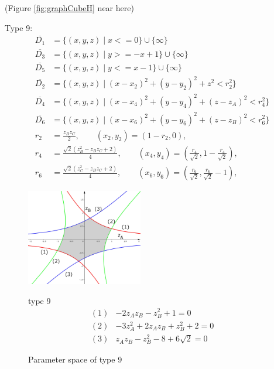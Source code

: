 \documentclass[suppldata, dvipdfmx]{interact}
\theoremstyle{plain}%
\theoremstyle{definition}
\theoremstyle{remark}
\theoremstyle{problemstyle}
\begin{document}
\noindent(Figure \ref{fig:graphCubeH} near here)
\bigskip\par
Type 9:
\begin{align*}
\overline{D_1}&=\{ (x,y,z) \mid x <= 0 \} \cup \{ \infty \}\\
\overline{D_3}&=\{(x,y,z) \mid y >= -x + 1 \} \cup\{\infty\}\\
\overline{D_5}&=\{(x,y,z) \mid y <= x - 1 \} \cup\{\infty\}\\
\overline{D_2}&=\{(x,y,z) \mid (x-x_2)^2+(y-y_2)^2+z^2<r_2^2 \} \\
\overline{D_4}&=\{(x,y,z) \mid (x-x_4)^2+(y-y_4)^2+(z-z_A)^2<r_4^2 \} \\
\overline{D_6}&=\{(x,y,z) \mid (x-x_6)^2+(y-y_6)^2+(z-z_B)^2<r_6^2 \} \\
 r_2 &= \frac{z_Bz_C}{2}, \qquad
(x_2, y_2) = \left(1-r_2, 0\right),\\
 r_4 &= \frac{\sqrt{2}(z_B^2 - z_Bz_C + 2)}{4}, \qquad
(x_4, y_4) = \left(\frac{r_4}{\sqrt{2}}, 1 - \frac{r_4}{\sqrt{2}}\right),\\
 r_6 &= \frac{\sqrt{2}(z_C^2 - z_Bz_C + 2)}{4}, \qquad
(x_6, y_6) = \left(\frac{r_6}{\sqrt{2}}, \frac{r_6}{\sqrt{2}} - 1\right),
\end{align*} 
\begin{figure}[h]
 \begin{minipage}[]{0.5\textwidth}
 \centering
 \includegraphics[width=2in,
 keepaspectratio]{./img/graph/cubeI.jpg}
 \caption{Parameter space of type 9}
 \label{fig:graphCubeI}
 \end{minipage}
 \hspace*{\fill}
 \begin{minipage}[]{0.5\textwidth}
  \centering
  type 9
  \begin{align*}
   (1)& -2z_Az_B - z_B^2 + 1 = 0\\
   (2)& -3z_A^2 + 2 z_A z_B + z_B^2 + 2 = 0\\
   (3)& z_Az_B - z_B^2 - 8 + 6\sqrt{2} = 0
  \end{align*}
 \end{minipage}
 \hspace*{\fill}
\end{figure}
\end{document}
